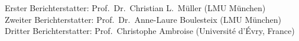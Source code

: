 \vspace*{\fill}

\noindent
Erster Berichterstatter: Prof.\ Dr.\ Christian L.~Müller (LMU München)\\
Zweiter Berichterstatter: Prof.\ Dr.\ Anne-Laure Boulesteix (LMU München)\\
Dritter Berichterstatter:  Prof.\ Christophe Ambroise (Université d'Évry, France)


\noindent

\vspace*{2.5cm}

\cleardoublepage